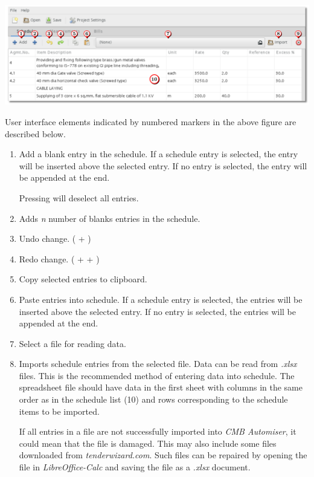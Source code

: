\documentclass[twoside,a4paper]{refart}
\newenvironment{noteblock}[1]%
{\begin{mdframed}[topline=false,bottomline=false, rightline=false,
		linewidth=2pt, frametitle={#1}]}%
		{\end{mdframed}}
\begin{document}
	 \begin{maxipage}
	 	\includegraphics[width=1\linewidth]{screenshots/window_sch.png}
	 \end{maxipage}
	 
	 User interface elements indicated by numbered markers in the above figure are described below.
	 
	 \begin{enumerate}
	 	\item Add a blank entry in the schedule. If a schedule entry is selected, the entry will be inserted above the selected entry. If no entry is selected, the entry will be appended at the end.\\
	 	\begin{noteblock}{Tips!}
	 		Pressing  will deselect all entries.
	 	\end{noteblock}
	 	\item Adds \emph{n} number of blanks entries in the schedule.
	 	\item Undo change. ( + )
	 	\item Redo change. ( +  + )	 
	 	\item Copy selected entries to clipboard.
	 	\item Paste entries into schedule. If a schedule entry is selected, the entries will be inserted above the selected entry. If no entry is selected, the entries will be appended at the end.
	 	\item Select a file for reading data.
	 	\item \attention Imports schedule entries from the selected file. Data can be read from \emph{.xlsx} files. This is the recommended method of entering data into schedule. The spreadsheet file should have data in the first sheet with columns in the same order as in the schedule list (10) and rows corresponding to the schedule items to be imported.\\
	 	\begin{noteblock}{Note:}
	 		If all entries in a file are not successfully imported into \emph{CMB Automiser}, it could mean that the file is damaged. This may also include some files downloaded from \emph{tenderwizard.com}. Such files can be repaired by opening the file in \emph{LibreOffice-Calc} and saving the file as a \emph{.xlsx} document.

\end{noteblock}
\end{enumerate}
\end{document}
